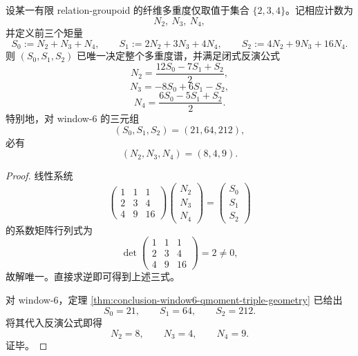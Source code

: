 \begin{theorem}\label{thm:conclusion-window6-three-moment-spectrum-inversion}
设某一有限 relation-groupoid 的纤维多重度仅取值于集合 \(\{2,3,4\}\)。记相应计数为
\[
N_2,\ N_3,\ N_4,
\]
并定义前三个矩量
\[
S_0:=N_2+N_3+N_4,\qquad
S_1:=2N_2+3N_3+4N_4,\qquad
S_2:=4N_2+9N_3+16N_4.
\]
则 \((S_0,S_1,S_2)\) 已唯一决定整个多重度谱，并满足闭式反演公式
\[
N_2=\frac{12S_0-7S_1+S_2}{2},
\]
\[
N_3=-8S_0+6S_1-S_2,
\]
\[
N_4=\frac{6S_0-5S_1+S_2}{2}.
\]
特别地，对 window-\(6\) 的三元组
\[
(S_0,S_1,S_2)=(21,64,212),
\]
必有
\[
(N_2,N_3,N_4)=(8,4,9).
\]
\end{theorem}
\begin{proof}
线性系统
\[
\begin{pmatrix}
1&1&1\\
2&3&4\\
4&9&16
\end{pmatrix}
\begin{pmatrix}
N_2\\ N_3\\ N_4
\end{pmatrix}
=
\begin{pmatrix}
S_0\\ S_1\\ S_2
\end{pmatrix}
\]
的系数矩阵行列式为
\[
\det
\begin{pmatrix}
1&1&1\\
2&3&4\\
4&9&16
\end{pmatrix}
=2\neq 0,
\]
故解唯一。直接求逆即可得到上述三式。

对 window-\(6\)，定理 \ref{thm:conclusion-window6-qmoment-triple-geometry} 已给出
\[
S_0=21,\qquad S_1=64,\qquad S_2=212.
\]
将其代入反演公式即得
\[
N_2=8,\qquad N_3=4,\qquad N_4=9.
\]
证毕。
\end{proof}


